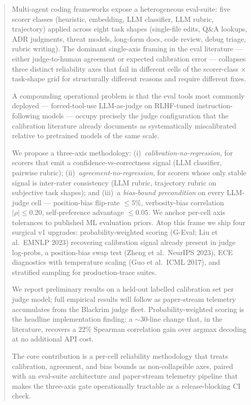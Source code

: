 \begin{abstract}
\noindent
Multi-agent coding frameworks expose a heterogeneous eval-suite: five scorer
classes (heuristic, embedding, LLM classifier, LLM rubric, trajectory)
applied across eight task shapes (single-file edits, Q\&A lookups, ADR
judgments, threat models, long-form docs, code review, debug triage, rubric
writing).
The dominant single-axis framing in the eval literature --- either
judge-to-human agreement or expected calibration error --- collapses three
distinct reliability axes that fail in different cells of the scorer-class
$\times$ task-shape grid for structurally different reasons and require
different fixes.

A compounding operational problem is that the eval tools most commonly
deployed --- forced-tool-use LLM-as-judge on RLHF-tuned instruction-following
models --- occupy precisely the judge configuration that the calibration
literature already documents as systematically miscalibrated relative to
pretrained models of the same scale.

We propose a three-axis methodology: (i)~\emph{calibration-no-regression},
for scorers that emit a confidence-vs-correctness signal (LLM classifier,
pairwise rubric); (ii)~\emph{agreement-no-regression}, for scorers whose only
stable signal is inter-rater consistency (LLM rubric, trajectory rubric on
subjective task shapes); and (iii)~a \emph{bias-bound precondition} on every
LLM-judge cell --- position-bias flip-rate $\leq 5\%$, verbosity-bias
correlation $|\rho| \leq 0.20$, self-preference advantage $\leq 0.05$.
We anchor per-cell axis tolerances to published ML evaluation priors.
Atop this frame we ship four surgical v1 upgrades: probability-weighted
scoring (G-Eval; Liu et al.\ EMNLP 2023) recovering calibration signal
already present in judge log-probs, a position-bias swap test
(Zheng et al.\ NeurIPS 2023), ECE diagnostics with temperature scaling
(Guo et al.\ ICML 2017), and stratified sampling for production-trace suites.

We report preliminary results on a held-out labelled calibration set per
judge model; full empirical results will follow as paper-stream telemetry
accumulates from the Blackrim judge fleet.
Probability-weighted scoring is the headline implementation finding: a
$\sim$30-line change that, in the literature, recovers a 22\% Spearman
correlation gain over argmax decoding at no additional API cost.

The core contribution is a per-cell reliability methodology that treats
calibration, agreement, and bias bounds as non-collapsible axes, paired with
an eval-suite architecture and paper-stream telemetry pipeline that makes the
three-axis gate operationally tractable as a release-blocking CI check.
\end{abstract}
